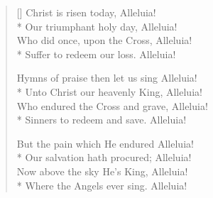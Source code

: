 \newHymn
{}

\begin{verse}[\versewidth]
 Christ is risen today, Alleluia!\\*
Our triumphant holy day, Alleluia!\\
Who did once, upon the Cross, Alleluia!\\*
Suffer to redeem our loss. Alleluia!

Hymns of praise then let us sing Alleluia!\\*
Unto Christ our heavenly King, Alleluia!\\
Who endured the Cross and grave, Alleluia!\\*
Sinners to redeem and save. Alleluia!

But the pain which He endured Alleluia!\\*
Our salvation hath procured; Alleluia!\\
Now above the sky He's King, Alleluia!\\*
Where the Angels ever sing. Alleluia!
\end{verse}


